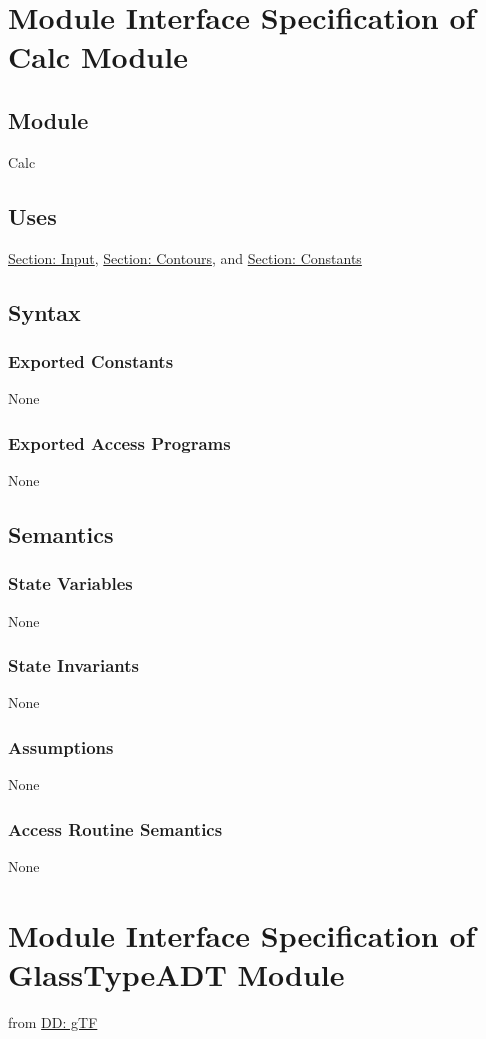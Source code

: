 \documentclass[12pt]{article}
\begin{document}
\section{Module Interface Specification of Calc Module}
\label{Sec:Calc}
\subsection{Module}
\label{Sec:Module}
Calc
\subsection{Uses}
\label{Sec:Uses}
\hyperref[Sec:InputADT]{Section: Input}, \hyperref[Sec:ContoursADT]{Section: Contours}, and \hyperref[Sec:ConstantsADT]{Section: Constants}
\subsection{Syntax}
\label{Sec:Syntax}
\subsubsection{Exported Constants}
\label{Sec:ExpConstants}
None
\subsubsection{Exported Access Programs}
\label{Sec:ExpAccPrograms}
None
\subsection{Semantics}
\label{Sec:Semantics}
\subsubsection{State Variables}
\label{Sec:StateVars}
None
\subsubsection{State Invariants}
\label{Sec:StateInvars}
None
\subsubsection{Assumptions}
\label{Sec:Assumps}
None
\subsubsection{Access Routine Semantics}
\label{Sec:AccRoutSemantics}
None
\section{Module Interface Specification of GlassTypeADT Module}
\label{Sec:GlassTypeADT}
from \hyperref[DD:gTF]{DD: gTF}
\end{document}
